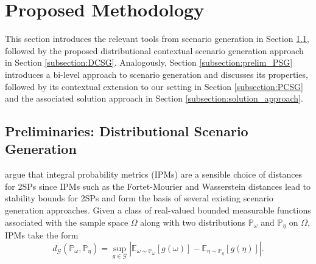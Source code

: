\section{Proposed Methodology}\label{section:methodology}
This section introduces the relevant tools from scenario generation in Section \ref{subsection:dsg}, followed by the proposed distributional contextual scenario generation approach in Section \ref{subsection:DCSG}. Analogously, Section \ref{subsection:prelim_PSG} introduces a bi-level approach to scenario generation and discusses its properties, followed by its contextual extension to our setting in Section \ref{subsection:PCSG} and the associated solution approach in Section \ref{subsection:solution_approach}.

\subsection{Preliminaries: Distributional Scenario Generation}\label{subsection:dsg}

\citet{romisch2003stability} argue that integral probability metrics (IPMs) are a sensible choice of distances for 2SPs since IPMs such as the Fortet-Mourier and Wasserstein distances lead to stability bounds for 2SPs and form the basis of several existing scenario generation approaches. Given a class of real-valued bounded measurable functions associated with the sample space $\Omega$ along with two distributions $\mathbb{P}_{\omega}$ and $\mathbb{P}_{\eta}$ on $\Omega$, IPMs take the form
\begin{equation*}\label{eq:ipm}
d_{\mathcal{G}}(\mathbb{P}_{\omega}, \mathbb{P}_{\eta}) = \sup_{g \in \mathcal{G}} \left|  \mathbb{E}_{\omega \sim \mathbb{P}_{\omega}} [g(\omega)] - \mathbb{E}_{\eta \sim \mathbb{P}_{\eta}} [g(\eta)] \right|.
\end{equation*}

